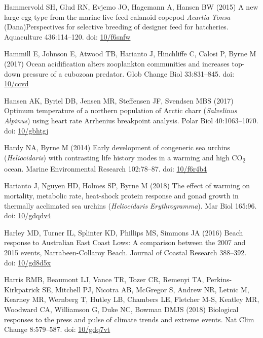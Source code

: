 \documentclass[a4paper,10pt, oneside]{memoir}
\begin{document}
\leavevmode\hypertarget{ref-Hammervold2015}{}%
Hammervold SH, Glud RN, Evjemo JO, Hagemann A, Hansen BW (2015) A new large egg type from the marine live feed calanoid copepod \emph{Acartia} \emph{Tonsa} (Dana)Perspectives for selective breeding of designer feed for hatcheries. Aquaculture 436:114--120. doi: \href{https://doi.org/10/f6snfw}{10/f6snfw}

\leavevmode\hypertarget{ref-Hammill2017}{}%
Hammill E, Johnson E, Atwood TB, Harianto J, Hinchliffe C, Calosi P, Byrne M (2017) Ocean acidification alters zooplankton communities and increases top-down pressure of a cubozoan predator. Glob Change Biol 33:831--845. doi: \href{https://doi.org/10/ccvd}{10/ccvd}

\leavevmode\hypertarget{ref-Hansen2017}{}%
Hansen AK, Byriel DB, Jensen MR, Steffensen JF, Svendsen MBS (2017) Optimum temperature of a northern population of Arctic charr (\emph{Salvelinus} \emph{Alpinus}) using heart rate Arrhenius breakpoint analysis. Polar Biol 40:1063--1070. doi: \href{https://doi.org/10/gbhtgj}{10/gbhtgj}

\leavevmode\hypertarget{ref-Hardy2014}{}%
Hardy NA, Byrne M (2014) Early development of congeneric sea urchins (\emph{Heliocidaris}) with contrasting life history modes in a warming and high CO\textsubscript{2} ocean. Marine Environmental Research 102:78--87. doi: \href{https://doi.org/10/f6r4b4}{10/f6r4b4}

\leavevmode\hypertarget{ref-Harianto2018}{}%
Harianto J, Nguyen HD, Holmes SP, Byrne M (2018) The effect of warming on mortality, metabolic rate, heat-shock protein response and gonad growth in thermally acclimated sea urchins (\emph{Heliocidaris} \emph{Erythrogramma}). Mar Biol 165:96. doi: \href{https://doi.org/10/gdqdv4}{10/gdqdv4}

\leavevmode\hypertarget{ref-Harley2016}{}%
Harley MD, Turner IL, Splinter KD, Phillips MS, Simmons JA (2016) Beach response to Australian East Coast Lows: A comparison between the 2007 and 2015 events, Narrabeen-Collaroy Beach. Journal of Coastal Research 388--392. doi: \href{https://doi.org/10/gd8d5x}{10/gd8d5x}

\leavevmode\hypertarget{ref-Harris2018}{}%
Harris RMB, Beaumont LJ, Vance TR, Tozer CR, Remenyi TA, Perkins-Kirkpatrick SE, Mitchell PJ, Nicotra AB, McGregor S, Andrew NR, Letnic M, Kearney MR, Wernberg T, Hutley LB, Chambers LE, Fletcher M-S, Keatley MR, Woodward CA, Williamson G, Duke NC, Bowman DMJS (2018) Biological responses to the press and pulse of climate trends and extreme events. Nat Clim Change 8:579--587. doi: \href{https://doi.org/10/gdq7vt}{10/gdq7vt}
\end{document}
